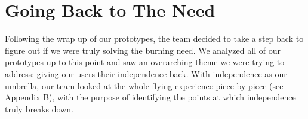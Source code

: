 
\section{Going Back to The Need}

Following the wrap up of our prototypes, the team decided to take a step back to figure out if we were truly solving the burning need. We analyzed all of our prototypes up to this point and saw an overarching theme we were trying to address: giving our users their independence back. With independence as our umbrella, our team looked at the whole flying experience piece by piece (see Appendix B), with the purpose of identifying the points at which independence truly breaks down. 

